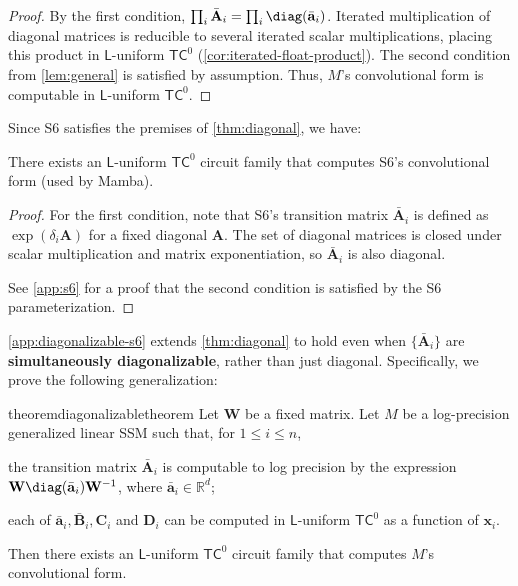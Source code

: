 \begin{proof}
    By the first condition, 
    $\prod_i \bar{\mathbf A}_i = \prod_i \diag(\bar{\mathbf{a}}_i)$.
    Iterated multiplication of diagonal matrices is reducible to several iterated scalar multiplications, placing this product in $\mathsf{L}$-uniform $\mathsf{TC}^0$ (\ref{cor:iterated-float-product}). 
    The second condition from \ref{lem:general} is satisfied by assumption. Thus, $M$'s convolutional form is computable in $\mathsf{L}$-uniform $\mathsf{TC}^0$.
\end{proof}

Since S6 satisfies the premises of \ref{thm:diagonal}, we have:

\begin{corollary} \label{cor:s6-mamba}
    There exists an $\mathsf{L}$-uniform $\mathsf{TC}^0$ circuit family that computes S6's convolutional form (used by Mamba).
\end{corollary}

\begin{proof}
    For the first condition, note that S6's transition matrix $\bar{\mathbf A}_i$ is defined as $\exp(\delta_i \mathbf{A})$ for a fixed diagonal $\mathbf A$. The set of diagonal matrices is closed under scalar multiplication and matrix exponentiation, so $\bar{\mathbf A}_i$ is also diagonal.

    See \ref{app:s6} for a proof that the second condition is satisfied by the S6 parameterization.
\end{proof}

\ref{app:diagonalizable-s6} extends \ref{thm:diagonal} to hold even when $\{\bar{\mathbf A}_i\}$ are \textbf{simultaneously diagonalizable}, rather than just diagonal. Specifically, we prove the following generalization:

\begin{restatable}{theorem}{diagonalizabletheorem} \label{thm:diagonalizable}
Let $\mathbf W$ be a fixed matrix. Let $M$ be a log-precision generalized linear SSM such that, for $1 \leq i \leq n$,
\begin{compactenum}
    \item the transition matrix $\bar{\mathbf A}_i$ is computable to log precision by the expression $\mathbf{W}\diag(\bar{\mathbf{a}}_i)\mathbf{W}^{-1}$, where $\bar{\mathbf a}_i \in \mathbb R^d$;
    \item each of $\bar{\mathbf a}_i, \bar{\mathbf B}_i, \mathbf C_i$ and $\mathbf D_i$ can be computed in $\mathsf{L}$-uniform $\mathsf{TC}^0$ as a function of $\mathbf x_i$.
\end{compactenum}
Then there exists an $\mathsf{L}$-uniform $\mathsf{TC}^0$ circuit family that computes $M$'s convolutional form.
\end{restatable}

